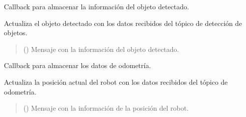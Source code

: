 \documentclass[a4paper,10pt,spanish]{sphinxmanual}
\begin{document}
\begin{fulllineitems}
\begin{fulllineitems}
\begin{quote}
\begin{description}
\end{description}\end{quote}

\end{fulllineitems}


\begin{fulllineitems}
\label{\detokenize{squad_approach_control_action:squad_approach_control_action.ApproachObjectActionServer.object_callback}}
\pysigstartsignatures
{}
\pysigstopsignatures
\sphinxAtStartPar
Callback para almacenar la información del objeto detectado.

\sphinxAtStartPar
Actualiza el objeto detectado con los datos recibidos del tópico de detección de objetos.
\begin{quote}\begin{description}
\sphinxAtStartPar
{} () \textendash{} Mensaje con la información del objeto detectado.

\end{description}\end{quote}

\end{fulllineitems}


\begin{fulllineitems}
\label{\detokenize{squad_approach_control_action:squad_approach_control_action.ApproachObjectActionServer.odom_callback}}
\pysigstartsignatures
{}
\pysigstopsignatures
\sphinxAtStartPar
Callback para almacenar los datos de odometría.

\sphinxAtStartPar
Actualiza la posición actual del robot con los datos recibidos del tópico de odometría.
\begin{quote}\begin{description}
\sphinxAtStartPar
{} () \textendash{} Mensaje con la información de la posición del robot.


\end{description}
\end{quote}
\end{fulllineitems}
\end{fulllineitems}
\end{document}
